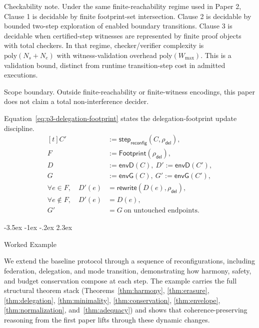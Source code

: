 \documentclass[a4paper,10pt,twocolumn,english]{article}
\makeatletter
\renewcommand{\section}{\@startsection{section}{1}{\z@}%
  {-3.5ex \@plus -1ex \@minus -.2ex}%
  {2.3ex}%
  {\raggedright\normalfont\large\bfseries}}
\numberwithin{equation}{section}
\theoremstyle{paperdef}
\theoremstyle{paperplain}
\theoremstyle{paperdef}
\theoremstyle{paperremark}
\theoremstyle{paperdef}
\newcommand{\envG}{\ensuremath{\mathsf{envG}}}
\newcommand{\envD}{\ensuremath{\mathsf{envD}}}
\newcommand{\ABHStack}{Theorems~\ref{thm:harmony}, \ref{thm:erasure}, \ref{thm:delegation}, \ref{thm:minimality}, \ref{thm:conservation}, \ref{thm:envelope}, \ref{thm:normalization}, and~\ref{thm:adequacy}}
\makeatother
\begin{document}
Checkability note. Under the same finite-reachability regime used in Paper 2,
Clause 1 is decidable by finite footprint-set intersection. Clause 2 is
decidable by bounded two-step exploration of enabled boundary transitions. Clause
3 is decidable when certified-step witnesses are represented by finite proof
objects with total checkers. In that regime, checker/verifier complexity is
$\mathrm{poly}(N_s+N_e)$ with witness-validation overhead
$\mathrm{poly}(W_{\max})$. This is a validation bound, distinct from runtime
transition-step cost in admitted executions.

Scope boundary. Outside finite-reachability or finite-witness encodings, this
paper does not claim a total non-interference decider.

Equation~\ref{eq:p3-delegation-footprint} states the delegation-footprint update discipline.
\begin{equation}
	\label{eq:p3-delegation-footprint}
	\begin{aligned}[t]
		C'                            & := \mathsf{step}_{\mathsf{reconfig}}(C,\rho_{\mathsf{del}}), \\
		F                             & := \mathsf{Footprint}(\rho_{\mathsf{del}}),                  \\
		D                             & := \envD(C),\ D' := \envD(C'),                               \\
		G                             & := \envG(C),\ G' := \envG(C'),                               \\
		\forall e\in F,\quad D'(e)    & =\mathsf{rewrite}(D(e),\rho_{\mathsf{del}}),                 \\
		\forall e\notin F,\quad D'(e) & =D(e),                                                       \\
		G'                            & = G\ \text{on untouched endpoints.}
	\end{aligned}
\end{equation}

\section{Worked Example}
\label{sec:example}

We extend the baseline protocol through a sequence of reconfigurations, including federation, delegation, and mode transition, demonstrating how harmony, safety, and budget conservation compose at each step. The example carries the full structural theorem stack (\ABHStack) and shows that coherence-preserving reasoning from the first paper lifts through these dynamic changes.
\end{document}
